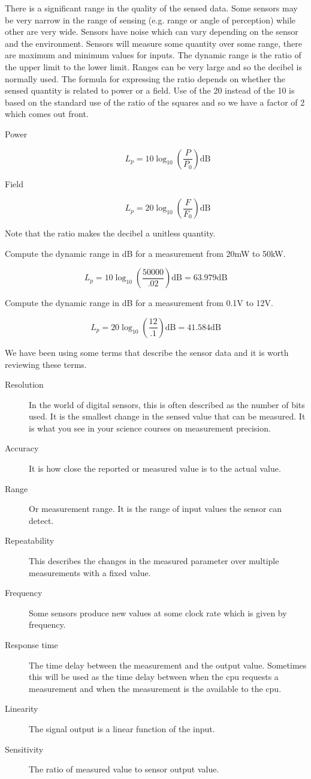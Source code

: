 There is a significant range in the quality of the sensed data. Some
sensors may be very narrow in the range of sensing (e.g. range or angle
of perception) while other are very wide. Sensors have noise which can
vary depending on the sensor and the environment. Sensors will measure
some quantity over some range, there are maximum and minimum values for
inputs. The dynamic range is the ratio of the upper limit to the lower
limit. Ranges can be very large and so the decibel is normally used. The
formula for expressing the ratio depends on whether the sensed quantity
is related to power or a field. Use of the 20 instead of the 10 is based
on the standard use of the ratio of the squares and so we have a factor
of 2 which comes out front.

\begin{description}
\item[Power]
\[L_p = 10\log_{10} \left( \frac{P}{P_0}\right) \mbox{dB}\]
\item[Field]
\[L_p = 20\log_{10} \left( \frac{F}{F_0}\right) \mbox{dB}\]
\end{description}

Note that the ratio makes the decibel a unitless quantity.

Compute the dynamic range in dB for a measurement from 20mW to 50kW.

\[L_p = 10\log_{10} \left( \frac{50000}{.02}\right) \mbox{dB} = 63.979 \mbox{dB}\]

Compute the dynamic range in dB for a measurement from 0.1V to 12V.

\[L_p = 20\log_{10} \left( \frac{12}{.1}\right) \mbox{dB} =  41.584\mbox{dB}\]

We have been using some terms that describe the sensor data and it is
worth reviewing these terms.

\begin{description}
\item[Resolution]
In the world of digital sensors, this is often described as the number
of bits used. It is the smallest change in the sensed value that can be
measured. It is what you see in your science courses on measurement
precision.
\item[Accuracy]
It is how close the reported or measured value is to the actual value.
\item[Range]
Or measurement range. It is the range of input values the sensor can
detect.
\item[Repeatability]
This describes the changes in the measured parameter over multiple
measurements with a fixed value.
\item[Frequency]
Some sensors produce new values at some clock rate which is given by
frequency.
\item[Response time]
The time delay between the measurement and the output value. Sometimes
this will be used as the time delay between when the cpu requests a
measurement and when the measurement is the available to the cpu.
\item[Linearity]
The signal output is a linear function of the input.
\item[Sensitivity]
The ratio of measured value to sensor output value.
\end{description}

